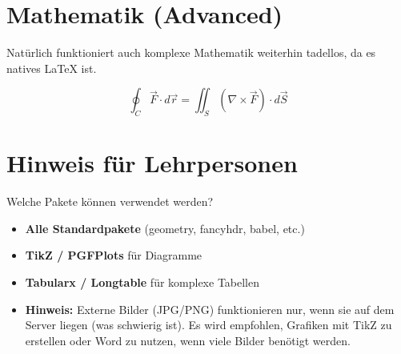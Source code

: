 \documentclass[12pt, a4paper]{article}
\begin{document}
\section{Mathematik (Advanced)}
Natürlich funktioniert auch komplexe Mathematik weiterhin tadellos, da es natives LaTeX ist.

$$ \oint_C \vec{F} \cdot d\vec{r} = \iint_S (\nabla \times \vec{F}) \cdot d\vec{S} $$

\section{Hinweis für Lehrpersonen}
Welche Pakete können verwendet werden?
\begin{itemize}
    \item \textbf{Alle Standardpakete} (geometry, fancyhdr, babel, etc.)
    \item \textbf{TikZ / PGFPlots} für Diagramme
    \item \textbf{Tabularx / Longtable} für komplexe Tabellen
    \item \textbf{Hinweis:} Externe Bilder (JPG/PNG) funktionieren nur, wenn sie auf dem Server liegen (was schwierig ist). Es wird empfohlen, Grafiken mit TikZ zu erstellen oder Word zu nutzen, wenn viele Bilder benötigt werden.
\end{itemize}
\end{document}
